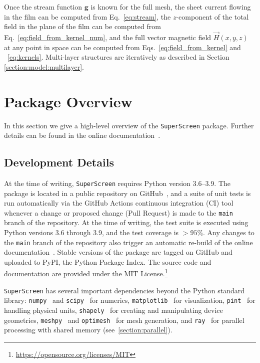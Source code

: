 \documentclass[final,3p,times,twocolumn]{elsarticle}
\newcommand{\inline}[1]{\texttt{#1}\xspace}
\newcommand{\SuperScreen}{\inline{SuperScreen}}
\begin{document}
Once the stream function $\mathbf{g}$ is known for the full mesh,
the sheet current flowing in the film can be computed from Eq.~\ref{eq:stream}, the $z$-component of the total field in the plane of the film can be computed
from Eq.~\ref{eq:field_from_kernel_num}, and the full vector magnetic field $\vec{H}(x, y, z)$
at any point in space can be computed from Eqs.~\ref{eq:field_from_kernel} and ~\ref{eq:kernels}. Multi-layer structures are  iteratively as described in Section \ref{section:model:multilayer}.

\section{Package Overview}
\label{section:overview}

In this section we give a high-level overview of the \SuperScreen package. Further details can be found in the online documentation~\cite{superscreen-rtd}.

\subsection{Development Details}
\label{section:overview:development}

At the time of writing, \SuperScreen requires Python version 3.6--3.9. The package is located in a public repository on GitHub~\cite{superscreen}, and a suite of unit tests is run automatically via the GitHub Actions continuous integration (CI) tool whenever a change or proposed change (Pull Request) is made to the \inline{main} branch of the repository. At the time of writing, the test suite is executed using Python versions 3.6 through 3.9, and the test coverage is $>95\%$. Any changes to the \inline{main} branch of the repository also trigger an automatic re-build of the online documentation~\cite{superscreen-rtd}. Stable versions of the package are tagged on GitHub and uploaded to PyPI, the Python Package Index. The source code and documentation are provided under the MIT License.\footnote{\href{https://opensource.org/licenses/MIT}{https://opensource.org/licenses/MIT}}

\SuperScreen has several important dependencies beyond the Python standard library: \inline{numpy}~\cite{Harris2020-xv} and \inline{scipy}~\cite{Virtanen2020-zz} for numerics, \inline{matplotlib}~\cite{Hunter2007-il} for visualization, \inline{pint}~\cite{Grecco} for handling physical units, \inline{shapely}~\cite{shapely} for creating and manipulating device geometries, \inline{meshpy}~\cite{Klockner, Shewchuk, Shewchuk1996-va} and \inline{optimesh}~\cite{Schlomer2021-ua} for mesh generation, and \inline{ray}~\cite{Moritz2018-mt,ray-docs} for parallel processing with shared memory (see~\ref{section:parallel}).
\end{document}
